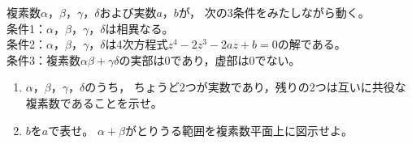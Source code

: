 \documentclass[../../main.tex]{subfiles}
\begin{document}
複素数$\alpha$，$\beta$，$\gamma$，$\delta$および実数$a$，$b$が，
次の3条件をみたしながら動く。\\
条件1：$\alpha$，$\beta$，$\gamma$，$\delta$は相異なる。\\
条件2：$\alpha$，$\beta$，$\gamma$，$\delta$は4次方程式$z^4-2z^3-2az+b=0$の解である。\\
条件3：複素数$\alpha\beta+\gamma\delta$の実部は0であり，虚部は0でない。
\begin{enumerate}
  \item$\alpha$，$\beta$，$\gamma$，$\delta$のうち，
    ちょうど2つが実数であり，残りの2つは互いに共役な複素数であることを示せ。
  \item$b$を$a$で表せ。
  $\alpha+\beta$がとりうる範囲を複素数平面上に図示せよ。
\end{enumerate}
\end{document}
